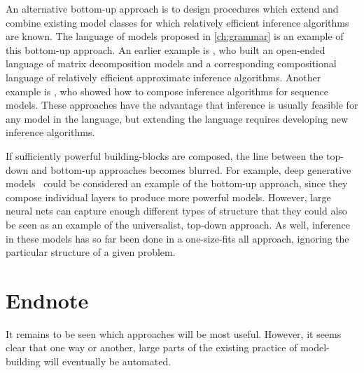 An alternative bottom-up approach is to design procedures which extend and combine existing model classes for which relatively efficient inference algorithms are known.
The language of models proposed in \cref{ch:grammar} is an example of this bottom-up approach.
An earlier example is \citet{roger-grosse-thesis}, who built an open-ended language of matrix decomposition models and a corresponding compositional language of relatively efficient approximate inference algorithms.
Another example is \citet{christian-thesis}, who showed how to compose inference algorithms for sequence models.
These approaches have the advantage that inference is usually feasible for any model in the language, but extending the language requires developing new inference algorithms.

If sufficiently powerful building-blocks are composed, the line between the top-down and bottom-up approaches becomes blurred.
For example, deep generative models~\citep{adams2010learning,damianou2012deep,rippel2013high,bengio2013generalized,salakhutdinov2009deep} could be considered an example of the bottom-up approach, since they compose individual layers to produce more powerful models.
However, large neural nets can capture enough different types of structure that they could also be seen as an example of the universalist, top-down approach.
As well, inference in these models has so far been done in a one-size-fits all approach, ignoring the particular structure of a given problem.

\section{Endnote}
It remains to be seen which approaches will be most useful.
However, it seems clear that one way or another, large parts of the existing practice of model-building will eventually be automated.












